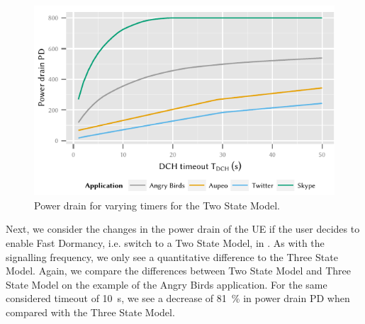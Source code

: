 \begin{figure}
	\centering
	\includegraphics{network/network_traces/numerical_results/figures/2_state_tdch_vs_power_drain}
	\caption{Power drain  for varying \TDCH timers for the Two State Model.}\label{fig:network:network_traces:numerical_results:two_states:power_drain}
\end{figure}
Next, we consider the changes in the power drain of the \gls{UE} if the user decides to enable Fast Dormancy, i.e. switch to a Two State Model, in .
As with the signalling frequency, we only see a quantitative difference to the Three State Model.
Again, we compare the differences between Two State Model and Three State Model on the example of the Angry Birds application.
For the same considered \TDCH timeout of \SI{10}{\second}, we see a decrease of \SI{81}{\percent} in power drain \gls{PD} when compared with the Three State Model.

